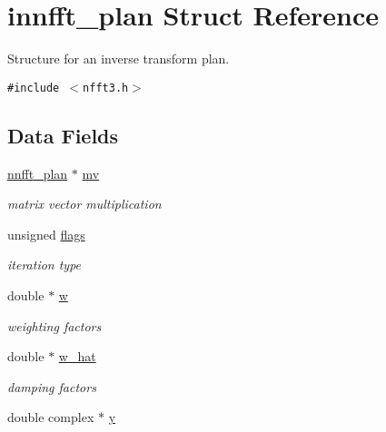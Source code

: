 \hypertarget{structinnfft__plan}{
\section{innfft\_\-plan Struct Reference}
\label{structinnfft__plan}
}
Structure for an inverse transform plan.  


{\tt \#include $<$nfft3.h$>$}

\subsection*{Data Fields}
\begin{CompactItemize}
\item 
\hypertarget{structinnfft__plan_o0}{
\hyperlink{structnnfft__plan}{nnfft\_\-plan} $\ast$ \hyperlink{structinnfft__plan_o0}{mv}}
\label{structinnfft__plan_o0}

\begin{CompactList}\small\item\em matrix vector multiplication \item\end{CompactList}\item 
\hypertarget{structinnfft__plan_o1}{
unsigned \hyperlink{structinnfft__plan_o1}{flags}}
\label{structinnfft__plan_o1}

\begin{CompactList}\small\item\em iteration type \item\end{CompactList}\item 
\hypertarget{structinnfft__plan_o2}{
double $\ast$ \hyperlink{structinnfft__plan_o2}{w}}
\label{structinnfft__plan_o2}

\begin{CompactList}\small\item\em weighting factors \item\end{CompactList}\item 
\hypertarget{structinnfft__plan_o3}{
double $\ast$ \hyperlink{structinnfft__plan_o3}{w\_\-hat}}
\label{structinnfft__plan_o3}

\begin{CompactList}\small\item\em damping factors \item\end{CompactList}\item 
\hypertarget{structinnfft__plan_o4}{
double complex $\ast$ \hyperlink{structinnfft__plan_o4}{y}}
\label{structinnfft__plan_o4}


\end{CompactItemize}
